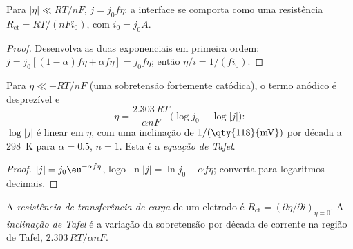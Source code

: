 \begin{corollary}\label{cor:b3:electrode-kinetics:linear}
Para $|\eta| \ll RT/nF$, $j = j_0f\eta$: a interface se comporta como uma resistência
$R_{\mathrm{ct}} = RT/(nFi_0)$, com $i_0 = j_0A$.
\end{corollary}

\begin{proof}
Desenvolva as duas exponenciais em primeira ordem: $j = j_0[(1 - \alpha)f\eta + \alpha f\eta] = j_0f\eta$; então
$\eta/i = 1/(fi_0)$.
\end{proof}

\begin{corollary}\label{cor:b3:electrode-kinetics:tafel}
Para $\eta \ll -RT/nF$ (uma sobretensão fortemente catódica), o termo anódico é
desprezível e
\[
  \eta = \frac{2.303\,RT}{\alpha nF}\bigl(\log j_0 - \log|j|\bigr):
\]
$\log|j|$ é linear em $\eta$, com uma inclinação de $1/(\text{\qty{118}{mV}})$ por década a \qty{298}{K} para $\alpha = 0.5$, $n =
1$. Esta é a \emph{equação de Tafel}.
\end{corollary}

\begin{proof}
$|j| = j_0\eu^{-\alpha f\eta}$, logo $\ln|j| = \ln j_0 - \alpha f\eta$; converta para logaritmos decimais.
\end{proof}

\begin{definition}\label{def:b3:electrode-kinetics:charge-transfer}
A \emph{resistência de transferência de carga} de um
eletrodo é $R_{\mathrm{ct}} = (\partial\eta/\partial i)_{\eta = 0}$. A \emph{inclinação de Tafel}
é a variação da sobretensão por década de corrente na região de Tafel,
$2.303\,RT/\alpha nF$.
\end{definition}

